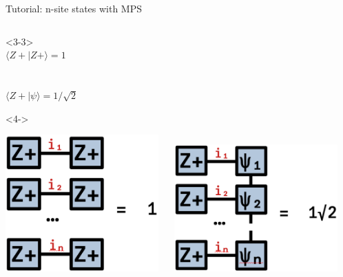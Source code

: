 \begin{frame}[fragile]{Tutorial: n-site states with MPS}
\begin{columns}
\begin{column}{5.5cm}
\begin{onlyenv}<3-3>
~\\
$\langle Z+|Z+\rangle = 1$ \\
~\\ %
~\\ %
$\langle Z+|\psi\rangle = 1/\sqrt{2}$ \\
\end{onlyenv}

\begin{onlyenv}<4->
\vspace*{0.0cm}
~\\
\begin{center}
\includegraphics[width=0.44\textwidth]{
  slides/assets/Zpn_Zpn.png
} \ \ %
\includegraphics[width=0.47\textwidth]{
  slides/assets/Zpn_catn.png
}
\end{center}
\vspace*{0.0cm}
\end{onlyenv}

\end{column}

\end{columns}

\end{frame}
